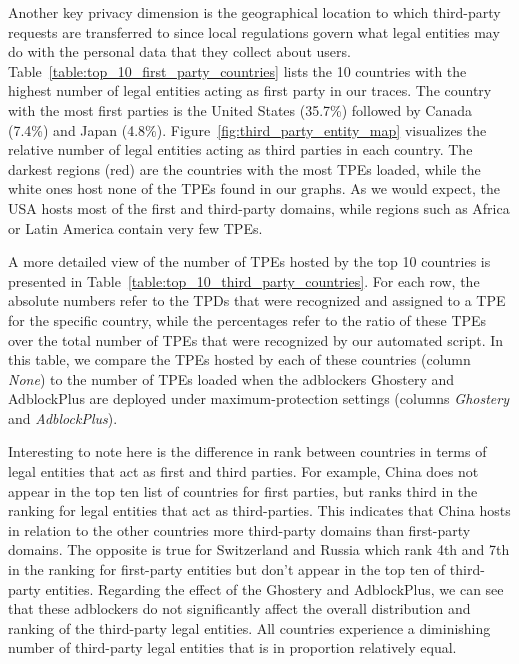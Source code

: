 \documentclass[compsoc, conference, letterpaper, 10pt, times]{IEEEtran}
\begin{document}
Another key privacy dimension is the geographical location to which third-party requests are transferred to since local regulations govern what legal entities may do with the personal data that they collect about users. Table~\ref{table:top_10_first_party_countries} lists the 10 countries with the highest number of legal entities acting as first party in our traces. The country with the most first parties is the United States (35.7\%) followed by Canada (7.4\%) and Japan (4.8\%).  Figure~\ref{fig:third_party_entity_map} visualizes the relative number of legal entities acting as third parties in each country.  The darkest regions (red) are the countries with the most TPEs loaded, while the white ones host none of the TPEs found in our graphs. As we would expect, the USA hosts most of the first and third-party domains, while regions such as Africa or Latin America contain very few TPEs.

A more detailed view of the number of TPEs hosted by the top 10 countries is presented in Table~\ref{table:top_10_third_party_countries}. For each row, the absolute numbers refer to the TPDs that were recognized and assigned to a TPE for the specific country, while the percentages refer to the ratio of these TPEs over the total number of TPEs that were recognized by our automated script. In this table, we compare the TPEs hosted by each of these countries (column \textit{None}) to the number of TPEs loaded when the adblockers Ghostery and AdblockPlus are deployed under maximum-protection settings (columns \textit{Ghostery} and \textit{AdblockPlus}).

Interesting to note here is the difference in rank between countries in terms of legal entities that act as first and third parties. For example, China does not appear in the top ten list of countries for first parties, but ranks third in the ranking for legal entities that act as third-parties. This indicates that China hosts in relation to the other countries more third-party domains than first-party domains. The opposite is true for Switzerland and Russia which rank 4th and 7th in the ranking for first-party entities but don't appear in the top ten of third-party entities. Regarding the effect of the Ghostery and AdblockPlus, we can see that these adblockers do not significantly affect the overall distribution and ranking of the third-party legal entities. All countries experience a diminishing number of third-party legal entities that is in proportion relatively equal.
\end{document}
